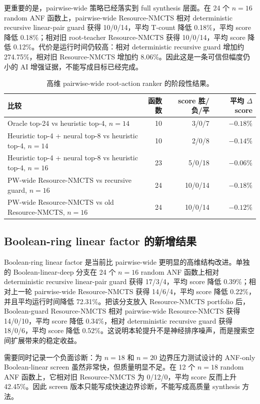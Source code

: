 \documentclass[UTF8,fontset=macnew,11pt]{ctexart}
\newcommand{\method}{Resource-NMCTS}
\begin{document}
更重要的是，pairwise-wide 策略已经落实到 full synthesis 层面。在 24 个 $n=16$ random ANF 函数上，pairwise-wide \method{} 相对 deterministic recursive linear-pair guard 获得 10/0/14，平均 T-count 降低 0.18\%，平均 score 降低 0.18\%；相对旧 root-teacher \method{} 获得 10/0/14，平均 score 降低 0.12\%。代价是运行时间仍较高：相对 deterministic recursive guard 增加约 274.75\%，相对旧 \method{} 增加约 8.06\%。因此这是一条可信但幅度仍小的 AI 增强证据，不能写成目标已经完成。

\begin{table}[t]
\centering
\small
\caption{高维 pairwise-wide root-action ranker 的阶段性结果。}
\label{tab:pairwise}
\begin{tabularx}{\linewidth}{>{\raggedright\arraybackslash}Xrrr}
\toprule
比较 & 函数数 & score 胜/负/平 & 平均 $\Delta$ score \\
\midrule
Oracle top-24 vs heuristic top-4, $n=14$ & 10 & 3/0/7 & $-0.18\%$ \\
Heuristic top-4 + neural top-8 vs heuristic top-4, $n=14$ & 10 & 2/0/8 & $-0.14\%$ \\
Heuristic top-4 + neural top-8 vs heuristic top-4, $n=16$ & 23 & 5/0/18 & $-0.06\%$ \\
PW-wide \method{} vs recursive guard, $n=16$ & 24 & 10/0/14 & $-0.18\%$ \\
PW-wide \method{} vs old \method{}, $n=16$ & 24 & 10/0/14 & $-0.12\%$ \\
\bottomrule
\end{tabularx}
\end{table}

\subsection{Boolean-ring linear factor 的新增结果}

Boolean-ring linear factor 是当前比 pairwise-wide 更明显的高维结构改进。单独的 Boolean-linear-deep 分支在 24 个 $n=16$ random ANF 函数上相对 deterministic recursive linear-pair guard 获得 17/3/4，平均 score 降低 0.39\%；相对上一轮 pairwise-wide \method{} 获得 14/6/4，平均 score 降低 0.22\%，并且平均运行时间降低 72.31\%。把该分支放入 Resource-NMCTS portfolio 后，Boolean-guard \method{} 相对 pairwise-wide \method{} 获得 14/0/10，平均 score 降低 0.34\%，相对 deterministic recursive guard 获得 18/0/6，平均 score 降低 0.52\%。这说明本轮提升不是神经排序噪声，而是搜索空间扩展带来的稳定收益。

需要同时记录一个负面诊断：为 $n=18$ 和 $n=20$ 边界压力测试设计的 ANF-only Boolean-linear screen 虽然非常快，但质量明显不足。在 12 个 $n=18$ random ANF 函数上，它相对旧 \method{} 为 0/12/0，平均 score 反而上升 42.45\%。因此 screen 版本只能写成快速边界诊断，不能写成高质量 synthesis 方法。
\end{document}
